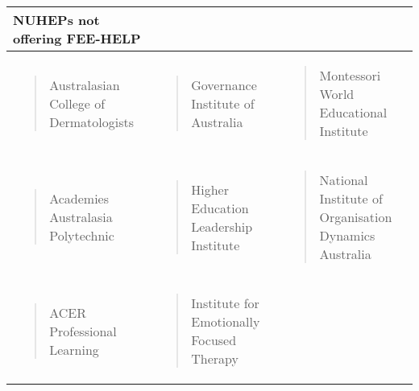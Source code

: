 \documentclass[]{book}
\begin{document}
\begin{longtable}[]{@{}lll@{}}
\toprule
\textbf{NUHEPs not offering FEE-HELP}\tabularnewline
\midrule
\endhead
\begin{minipage}[t]{0.32\columnwidth}\raggedright
\begin{quote}
Australasian College of Dermatologists
\end{quote}\strut
\end{minipage} & \begin{minipage}[t]{0.32\columnwidth}\raggedright
\begin{quote}
Governance Institute of Australia
\end{quote}\strut
\end{minipage} & \begin{minipage}[t]{0.32\columnwidth}\raggedright
\begin{quote}
Montessori World Educational Institute
\end{quote}\strut
\end{minipage}\tabularnewline
\begin{minipage}[t]{0.32\columnwidth}\raggedright
\begin{quote}
Academies Australasia Polytechnic
\end{quote}\strut
\end{minipage} & \begin{minipage}[t]{0.32\columnwidth}\raggedright
\begin{quote}
Higher Education Leadership Institute
\end{quote}\strut
\end{minipage} & \begin{minipage}[t]{0.32\columnwidth}\raggedright
\begin{quote}
National Institute of Organisation Dynamics Australia
\end{quote}\strut
\end{minipage}\tabularnewline
\begin{minipage}[t]{0.32\columnwidth}\raggedright
\begin{quote}
ACER Professional Learning
\end{quote}\strut
\end{minipage} & \begin{minipage}[t]{0.32\columnwidth}\raggedright
\begin{quote}
Institute for Emotionally Focused Therapy
\end{quote}\strut
\end{minipage} & \begin{minipage}[t]{0.32\columnwidth}\raggedright

\end{minipage}
\end{longtable}
\end{document}
